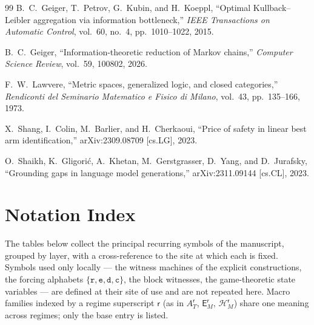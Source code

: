 \documentclass[12pt]{article}
\theoremstyle{definition}
\newcommand{\Hcal}{\mathcal H}
\newcommand{\Est}{\mathsf E}
\newcommand{\Aapp}{A_T}
\begin{document}
\begin{thebibliography}{99}
B.~C.~Geiger, T.~Petrov, G.~Kubin, and H.~Koeppl,
``Optimal Kullback--Leibler aggregation via information bottleneck,''
\emph{IEEE Transactions on Automatic Control},
vol.~60, no.~4, pp.~1010--1022, 2015.

B.~C.~Geiger,
``Information-theoretic reduction of Markov chains,''
\emph{Computer Science Review}, vol.~59, 100802, 2026.

F.~W.~Lawvere,
``Metric spaces, generalized logic, and closed categories,''
\emph{Rendiconti del Seminario Matematico e Fisico di Milano},
vol.~43, pp.~135--166, 1973.

X.~Shang, I.~Colin, M.~Barlier, and H.~Cherkaoui,
``Price of safety in linear best arm identification,''
arXiv:2309.08709 [cs.LG], 2023.

O.~Shaikh, K.~Gligori\'c, A.~Khetan, M.~Gerstgrasser, D.~Yang, and
D.~Jurafsky,
``Grounding gaps in language model generations,''
arXiv:2311.09144 [cs.CL], 2023.

\end{thebibliography}

\section*{Notation Index}
\label{sec:notation-index}

The tables below collect the principal recurring symbols of the manuscript,
grouped by layer, with a cross-reference to the site at which each is fixed.
Symbols used only locally --- the witness machines of the explicit
constructions, the forcing alphabets $\{\mathtt r,\mathtt e,\mathtt d,
\mathtt c\}$, the block witnesses, the game-theoretic state variables ---
are defined at their site of use and are not repeated here.  Macro families
indexed by a regime superscript $\mathsf r$ (as in
$\Aapp^{\mathsf r}$, $\Est_M^{\mathsf r}$, $\Hcal_M^{\mathsf r}$) share one
meaning across regimes; only the base entry is listed.
\end{document}
